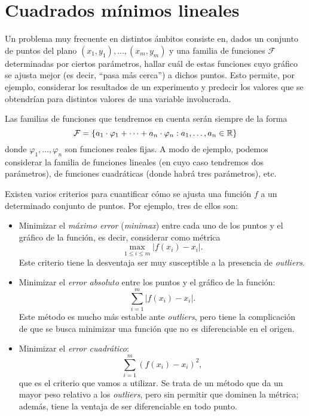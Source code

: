 
\section{Cuadrados mínimos lineales}
\label{section:cml}

Un problema muy frecuente en distintos ámbitos consiste en, dados
un conjunto de puntos del plano $(x_1,y_1), \dots, (x_m,y_m)$ y una familia
de funciones $\mathcal{F}$ determinadas por ciertos parámetros, hallar
cuál de estas funciones cuyo gráfico se ajusta mejor (es decir, ``pasa más
cerca'') a dichos puntos. Esto permite, por ejemplo, considerar los resultados
de un experimento y predecir los valores que se obtendrían para distintos
valores de una variable involucrada.

Las familias de funciones que tendremos en cuenta serán siempre de la forma
\[ \mathcal{F} = \{ a_1 \cdot \varphi_1 + \dots + a_n \cdot \varphi_n
    : a_1, \dots, a_n \in \mathbb{R} \} \]
donde $\varphi_1, \dots, \varphi_n$ son funciones reales fijas. A modo de
ejemplo, podemos considerar la familia de funciones lineales (en cuyo caso
tendremos dos parámetros), de funciones cuadráticas (donde habrá tres
parámetros), etc.

Existen varios criterios para cuantificar cómo se ajusta una función $f$ a un
determinado conjunto de puntos. Por ejemplo, tres de ellos son:
\begin{itemize}
\item Minimizar el \emph{máximo error} (\emph{minimax}) entre cada uno de los
    puntos y el gráfico de la función, es decir, considerar como métrica
    \[ \max_{1\leq i \leq m} \left\vert f(x_i) - x_i \right\vert. \]
    Este criterio tiene la desventaja ser muy susceptible a la presencia
    de \emph{outliers}.
\item Minimizar el \emph{error absoluto} entre los puntos y el gráfico de la
    función:
    \[ \sum_{i = 1}^{m} \left\vert f(x_i) - x_i \right\vert. \]
    Este método es mucho más estable ante \emph{outliers}, pero tiene la
    complicación de que se busca minimizar una función que no es
    diferenciable en el origen.
\item Minimizar el \emph{error cuadrático}:
    \[ \sum_{i = 1}^{m} \left( f(x_i) - x_i \right)^2, \]
    que es el criterio que vamos a utilizar. Se trata de un método que da
    un mayor peso relativo a los \emph{outliers}, pero sin permitir que
    dominen la métrica; además, tiene la ventaja de ser diferenciable en todo
    punto.
\end{itemize}

